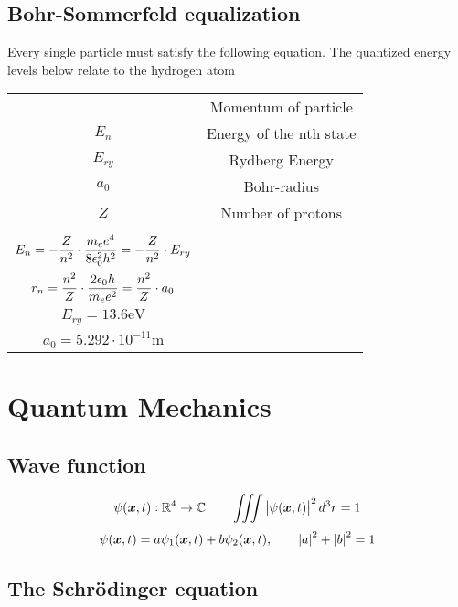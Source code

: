 \documentclass{article}
\begin{document}
\begin{twocolumn}
\subsection{Bohr-Sommerfeld equalization}

Every single particle must satisfy the following equation. The quantized energy levels below relate to the hydrogen atom

\begin{tabular}{cc}
	\begin{dtabular}
		$p$ & Momentum of particle \\
		$E_n$ & Energy of the nth state \\
		$E_{ry}$ & Rydberg Energy \\
		$a_0$ & Bohr-radius \\
		$Z$ & Number of protons \\	
	\end{dtabular} &
	\begin{mtabular}{c}
		$\fmm \int_{length} p \cdot ds = n \cdot h \qquad n \in \mathbb{N}$ \\
		$\displaystyle E_n = -\frac{Z}{n^2} \cdot \frac{m_e e^4}{8 \epsilon_0^2 h^2} = - \frac{Z}{n^2} \cdot E_{ry} $ \\
		$\displaystyle r_n = \frac{n^2}{Z} \cdot \frac{2 \epsilon_0 h}{m_e e^2} = \frac{n^2}{Z} \cdot a_0$ \\
		$E_{ry} = 13.6 \si{\electronvolt}$ \\
		$a_0 = 5.292 \cdot 10^{-11} \si{\meter}$
	\end{mtabular}
\end{tabular}

\section{Quantum Mechanics}

\begin{donotbrake}
\subsection{Wave function}
$$\psi(\bm{x}, t): \mathbb{R}^4 \rightarrow \mathbb{C} \qquad \iiint \left| \psi(\bm{x},t) \right|^2 d^3r = 1 $$
$$\psi(\bm{x}, t) = a \psi_1(\bm{x},t) + b \psi_2(\bm{x}, t), \qquad \left| a \right|^2 + \left| b \right|^2 = 1$$
\end{donotbrake}

\begin{donotbrake}
\subsection{The Schrödinger equation}


\end{donotbrake}
\end{twocolumn}
\end{document}
